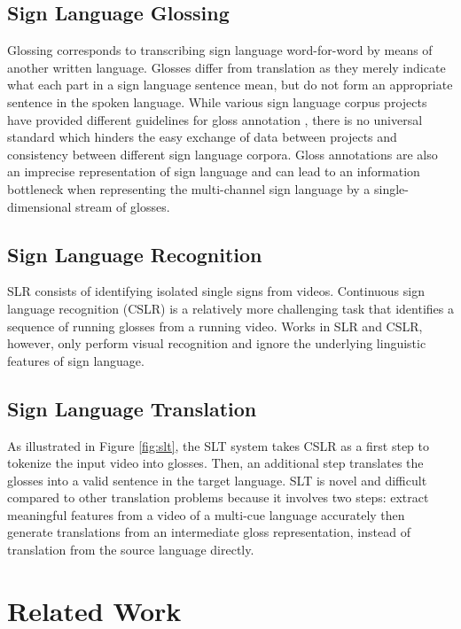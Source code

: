 \documentclass[11pt]{article}
\begin{document}
\subsection{Sign Language Glossing}
Glossing corresponds to transcribing sign language word-for-word by means of another written language. Glosses differ from translation as they merely indicate what each part in a sign language sentence mean, but do not form an appropriate sentence in the spoken language. While various sign language corpus projects have provided different guidelines for gloss annotation \cite{sign1,sign2}, there is no universal standard which hinders the easy exchange of data between projects and consistency between different sign language corpora. Gloss annotations are also an imprecise representation of sign language and can lead to an information bottleneck when representing the multi-channel sign language by a single-dimensional stream of glosses.


\subsection{Sign Language Recognition}

SLR consists of identifying isolated single signs from videos. Continuous sign language recognition (CSLR) is a relatively more challenging task that identifies a sequence of running glosses from a running video. Works
in SLR and CSLR, however, only perform visual recognition and ignore the underlying linguistic features of sign language.





\subsection{Sign Language Translation}
As illustrated in Figure \ref{fig:slt}, the SLT system takes CSLR as a first step to tokenize the input video into glosses. Then, an additional step translates the glosses into a valid sentence in the target language. SLT is novel and difficult compared to other translation problems because it involves two steps: extract meaningful features from a video of a multi-cue language accurately then generate translations from an intermediate gloss representation, instead of translation from the source language directly.



\section{Related Work}
\label{sec:headings}
\end{document}
